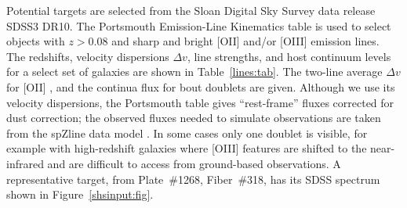 \documentclass[preprint2, 10pt]{aastex}
\begin{document}
Potential targets are selected from the Sloan Digital Sky Survey data release SDSS3 DR10.  The  Portsmouth Emission-Line Kinematics table \citep{2013MNRAS.431.1383T}  is used to select
objects 
with $z>0.08$
and sharp and bright [OII] and/or [OIII] emission lines.
The redshifts, velocity dispersions $\Delta v$, line strengths, and host continuum levels for a select set of galaxies are shown in Table~\ref{lines:tab}. 
The two-line average $\Delta v$ for [OII] , and the continua flux for bout doublets  are given.
Although we use its velocity dispersions, the Portsmouth table  gives ``rest-frame'' fluxes corrected for dust correction;
the observed fluxes needed to simulate observations are taken from the spZline data model
\citep{2012AJ....144..144B}.  In some cases only one doublet is visible, for example with high-redshift galaxies where [OIII] features are shifted to the near-infrared and are difficult to access from ground-based observations.
A representative 
target, from Plate~\#1268, Fiber~\#318, has its  SDSS spectrum shown in Figure~\ref{shsinput:fig}.
\end{document}
